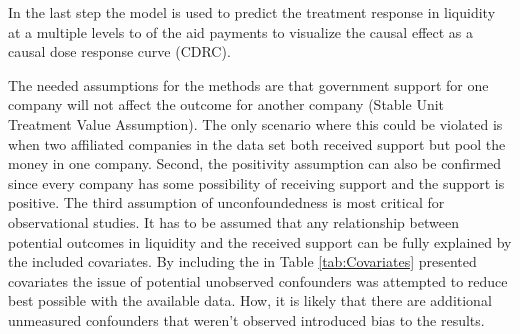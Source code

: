     In the last step the model is used to predict the treatment response in liquidity at a multiple levels to of the aid payments to visualize the causal effect as a causal dose response curve (CDRC).

    The needed assumptions for the methods are that government support for one company will not affect the outcome for another company (Stable Unit Treatment Value Assumption). The only scenario where this could be violated is when two affiliated companies in the data set both received support but pool the money in one company. Second, the positivity assumption can also be confirmed since every company has some possibility of receiving support and the support is positive. The third assumption of unconfoundedness is most critical for observational studies. It has to be assumed that any relationship between potential outcomes in liquidity and the received support can be fully explained by the included covariates. By including the in Table \ref{tab:Covariates} presented covariates the issue of potential unobserved confounders was attempted to reduce best possible with the available data. How, it is likely that there are additional unmeasured confounders that weren't observed introduced bias to the results. 
        